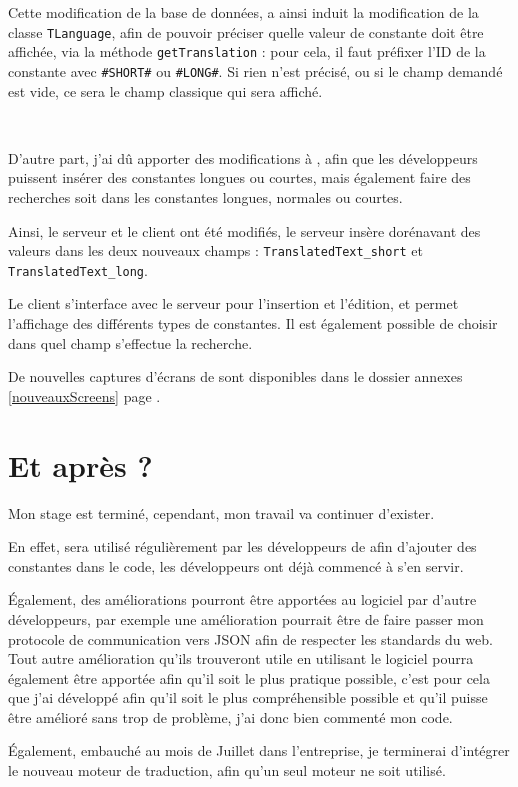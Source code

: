 	Cette modification de la base de données, a ainsi induit la modification de la classe \texttt{TLanguage}, afin de pouvoir préciser quelle valeur de constante doit être affichée, via la méthode \texttt{getTranslation} : pour cela, il faut préfixer l'ID de la constante avec \texttt{\#SHORT\#} ou \texttt{\#LONG\#}. Si rien n'est précisé, ou si le champ demandé est vide, ce sera le champ classique qui sera affiché.

	\begin{exemple}
~
\end{exemple}

	D'autre part, j'ai dû apporter des modifications à \mlanguage{}, afin que les développeurs puissent
	insérer des constantes longues ou courtes, mais également faire des recherches soit dans les constantes
	longues, normales ou courtes.

    Ainsi, le serveur et le client ont été modifiés, le serveur insère dorénavant des valeurs dans les deux nouveaux champs : \mbox{\texttt{TranslatedText\_short}} et \texttt{TranslatedText\_long}.

    Le client s'interface avec le serveur pour l'insertion et l'édition, et permet l'affichage des différents types de constantes. Il est également possible de choisir dans quel champ s'effectue la recherche.

    De nouvelles captures d'écrans de \mlanguage{} sont disponibles dans le dossier annexes    \ref{nouveauxScreens} page \pageref{nouveauxScreens}.

\section{Et après ?}
Mon stage est terminé, cependant, mon travail va continuer d'exister.

En effet, \mlanguage{} sera utilisé régulièrement par les développeurs de \adt{} afin d'ajouter des constantes dans le code, les développeurs ont déjà commencé à s'en servir.

\'Egalement, des améliorations pourront être apportées au logiciel par d'autre développeurs, par exemple une amélioration pourrait être de faire passer mon protocole de communication vers JSON afin de respecter les standards du web. Tout autre amélioration qu'ils trouveront utile en utilisant le logiciel pourra également être apportée afin qu'il soit le plus pratique possible, c'est pour cela que j'ai développé \mlanguage{} afin qu'il soit le plus compréhensible possible et qu'il puisse être amélioré sans trop de problème, j'ai donc bien commenté mon code.

\'Egalement, embauché au mois de Juillet dans l'entreprise, je terminerai d'intégrer le nouveau moteur de traduction, afin qu'un seul moteur ne soit utilisé.



